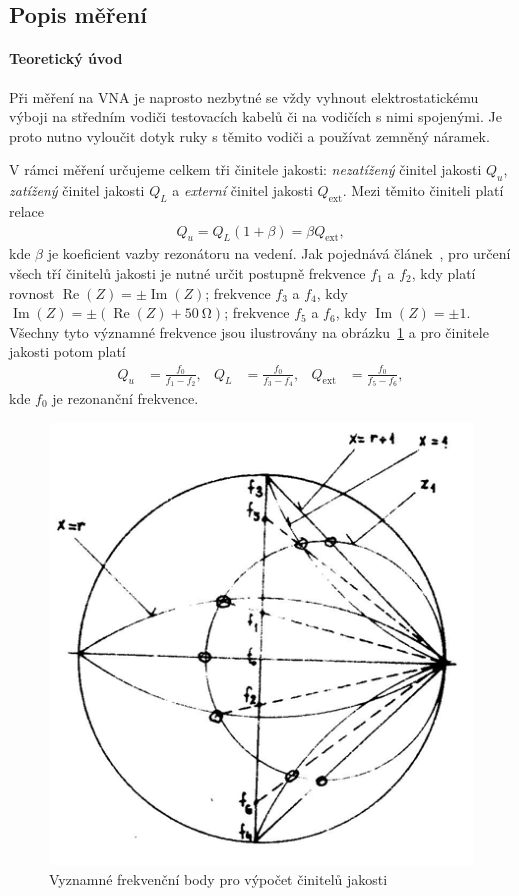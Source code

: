 \documentclass[11pt,a4paper]{article}
\renewcommand{\Re}{\operatorname{Re}}
\renewcommand{\Im}{\operatorname{Im}}
\newcommand{\Ohm}{\mathrm{\Omega}}
\begin{document}
\subsection*{Popis měření}
\paragraph*{Teoretický úvod} Při měření na VNA je naprosto nezbytné se vždy vyhnout elektrostatickému výboji na středním vodiči testovacích kabelů či na vodičích s nimi spojenými. Je proto nutno vyloučit dotyk ruky s těmito vodiči a používat zemněný náramek.

V rámci měření určujeme celkem tři činitele jakosti: \emph{nezatížený} činitel jakosti $Q_u$, \emph{zatížený} činitel jakosti $Q_L$ a \emph{externí} činitel jakosti $Q_{\mathrm{ext}}$. Mezi těmito činiteli platí relace
\begin{align*}
    Q_u = Q_L(1+\beta)=\beta Q_{\mathrm{ext}},
\end{align*}
kde $\beta$ je koeficient vazby rezonátoru na vedení. Jak pojednává článek~\cite{tysl:mereni-pri-velmi-vysokych-kmitoctech}, pro určení všech tří činitelů jakosti je nutné určit postupně frekvence $f_1$ a $f_2$, kdy platí rovnost $\Re(Z) = \pm\Im(Z)$; frekvence $f_3$ a $f_4$, kdy $\Im(Z) = \pm(\Re(Z) + 50\ \Ohm)$; frekvence $f_5$ a $f_6$, kdy $\Im(Z) = \pm1$. Všechny tyto významné frekvence jsou ilustrovány na obrázku~\ref{fig:smitak-kruznice} a pro činitele jakosti potom platí
\begin{align}
    Q_u &= \frac{f_0}{f_1-f_2},
    &
    Q_L &= \frac{f_0}{f_3-f_4},
    &
    Q_{\mathrm{ext}} &= \frac{f_0}{f_5-f_6},
\end{align}
kde $f_0$ je rezonanční frekvence.
\begin{figure}[!ht]
    \centering
    \includegraphics[width=.5\textwidth]{src/smitak-kruznice.png}
    \caption{\label{fig:smitak-kruznice}Vyznamné frekvenční body pro výpočet činitelů jakosti}
\end{figure}
\end{document}
